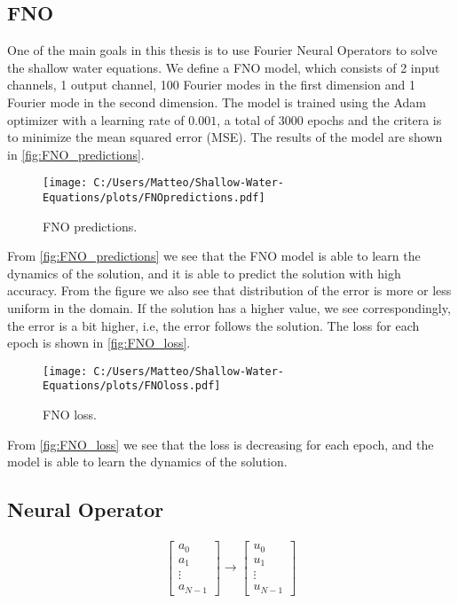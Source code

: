 \subsection{FNO}
One of the main goals in this thesis is to use Fourier Neural Operators to solve the shallow water equations.
We define a FNO model, which consists of 2 input channels, 1 output channel, 100 Fourier modes in the first dimension and 1 Fourier mode in the second dimension.
The model is trained using the Adam optimizer with a learning rate of $0.001$, a total of $3000$ epochs and the critera is to minimize the mean squared error (MSE).
The results of the model are shown in \autoref{fig:FNO_predictions}.
\begin{figure}[H]
    \centering
    \texttt{[image: C:/Users/Matteo/Shallow-Water-Equations/plots/FNOpredictions.pdf]}
    \caption{FNO predictions.}\label{fig:FNO_predictions}
\end{figure}
From \autoref{fig:FNO_predictions} we see that the FNO model is able to learn the dynamics of the solution, and it is able to predict the solution with high accuracy.
From the figure we also see that distribution of the error is more or less uniform in the domain. If the solution has a higher value, we see correspondingly, the error is a bit higher, i.e, the error follows the solution.
The loss for each epoch is shown in \autoref{fig:FNO_loss}.
\begin{figure}[H]
    \centering
    \texttt{[image: C:/Users/Matteo/Shallow-Water-Equations/plots/FNOloss.pdf]}
    \caption{FNO loss.}\label{fig:FNO_loss}
\end{figure}
From \autoref{fig:FNO_loss} we see that the loss is decreasing for each epoch, and the model is able to learn the dynamics of the solution.


\subsection{Neural Operator}

\begin{align*}
    \begin{bmatrix}
        a_0 \\
        a_1 \\
        \vdots \\
        a_{N-1}
    \end{bmatrix}
    \to
    \begin{bmatrix}
        u_0 \\
        u_1 \\
        \vdots \\
        u_{N-1}
    \end{bmatrix}
\end{align*}




